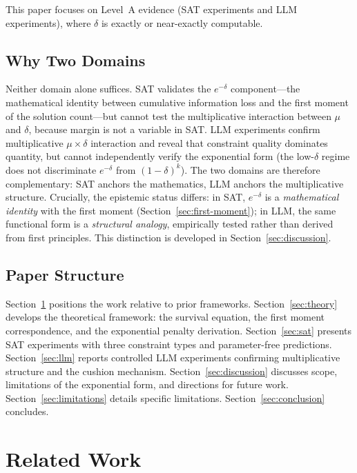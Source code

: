 \documentclass[11pt,a4paper]{article}
\begin{document}
This paper focuses on Level~A evidence (SAT experiments and LLM experiments), where $\delta$ is exactly or near-exactly computable.

\subsection{Why Two Domains}

Neither domain alone suffices. SAT validates the $e^{-\delta}$ component---the mathematical identity between cumulative information loss and the first moment of the solution count---but cannot test the multiplicative interaction between $\mu$ and $\delta$, because margin is not a variable in SAT. LLM experiments confirm multiplicative $\mu \times \delta$ interaction and reveal that constraint quality dominates quantity, but cannot independently verify the exponential form (the low-$\delta$ regime does not discriminate $e^{-\delta}$ from $(1-\delta)^k$). The two domains are therefore complementary: SAT anchors the mathematics, LLM anchors the multiplicative structure. Crucially, the epistemic status differs: in SAT, $e^{-\delta}$ is a \emph{mathematical identity} with the first moment (Section~\ref{sec:first-moment}); in LLM, the same functional form is a \emph{structural analogy}, empirically tested rather than derived from first principles. This distinction is developed in Section~\ref{sec:discussion}.

\subsection{Paper Structure}

Section~\ref{sec:related} positions the work relative to prior frameworks. Section~\ref{sec:theory} develops the theoretical framework: the survival equation, the first moment correspondence, and the exponential penalty derivation. Section~\ref{sec:sat} presents SAT experiments with three constraint types and parameter-free predictions. Section~\ref{sec:llm} reports controlled LLM experiments confirming multiplicative structure and the cushion mechanism. Section~\ref{sec:discussion} discusses scope, limitations of the exponential form, and directions for future work. Section~\ref{sec:limitations} details specific limitations. Section~\ref{sec:conclusion} concludes.

\section{Related Work}
\label{sec:related}
\end{document}
